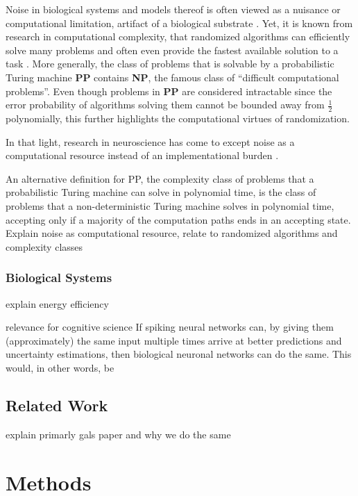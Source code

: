 \documentclass[10pt,a4paper,twocolumn]{article}
\begin{document}
Noise in biological systems and models thereof is often viewed as a nuisance or computational limitation, artifact of a biological substrate \cite{maass2014noise}. Yet, it is known from research in computational complexity, that randomized algorithms can efficiently solve many problems and often even provide the fastest available solution to a task \cite{motwani2010randomized}. More generally, the class of problems that is solvable by a probabilistic Turing machine \textbf{PP} contains \textbf{NP}, the famous class of ``difficult computational problems''. Even though problems in \textbf{PP} are considered intractable since the error probability of algorithms solving them cannot be bounded away from $\frac{1}{2}$ polynomially, this further highlights the computational virtues of randomization. 

In that light, research in neuroscience has come to except noise as a computational resource instead of an implementational burden \cite{maass2014noise}.

An alternative definition for PP, the complexity class of problems that a probabilistic Turing machine can solve in polynomial time, is the class of problems that a non-deterministic Turing machine solves in polynomial time, accepting only if a majority of the computation paths ends in an accepting state.
Explain noise as computational resource, relate to randomized algorithms and complexity classes

\subsubsection{Biological Systems}
explain energy efficiency

relevance for cognitive science
If spiking neural networks can, by giving them (approximately) the same input multiple times arrive at better predictions and uncertainty estimations, then biological neuronal networks can do the same. This would, in other words, be 

\subsection{Related Work}
explain primarly gals paper and why we do the same

\section{Methods}
\end{document}
